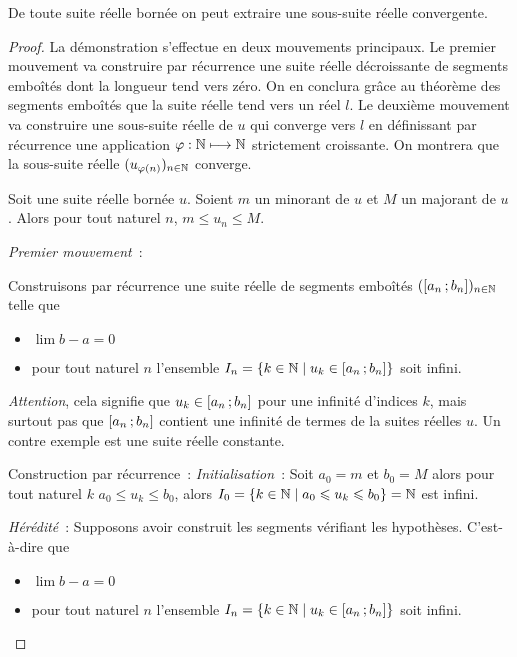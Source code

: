 \begin{theo}
  De toute suite réelle bornée on peut extraire une sous-suite réelle convergente.
\end{theo}
\begin{proof}
 La démonstration s'effectue en deux mouvements principaux. Le premier mouvement va construire par récurrence une suite réelle décroissante de segments emboîtés dont la longueur tend vers zéro. On en conclura grâce au théorème des segments emboîtés que la suite réelle tend vers un réel \(l\). Le deuxième mouvement va construire une sous-suite réelle de \(u\) qui converge vers \(l\) en définissant par récurrence une application \(\varphi : \mathbb{N} \longmapsto \mathbb{N}\) strictement croissante. On montrera que la sous-suite réelle \((u_{\varphi(n)})_{n \in \mathbb{N}}\) converge.

 Soit une suite réelle bornée \(u\). Soient \(m\) un minorant de \(u\) et \(M\) un majorant de \(u\). Alors pour tout naturel \(n\), \(m \leqslant u_n \leqslant M\).

\emph{Premier mouvement}~:

Construisons par récurrence une suite réelle de segments emboîtés \((\left[ a_n \, ;  b_n \right])_{n \in \mathbb{N}}\) telle que
\begin{itemize}
\item \(\lim b-a =0\)
\item pour tout naturel \(n\) l'ensemble \(I_n = \left\{k \in \mathbb{N}\mathrel{}\middle|\mathrel{}u_k \in \left[ a_n \, ;  b_n \right]\right\}\) soit infini.
\end{itemize}

\emph{Attention}, cela signifie que \(u_k \in \left[ a_n \, ;  b_n \right]\) pour une infinité d'indices \(k\), mais surtout pas que \(\left[ a_n \, ;  b_n \right]\) contient une infinité de termes de la suites réelles \(u\). Un contre exemple est une suite réelle constante.

Construction par récurrence~:
\emph{Initialisation}~: Soit \(a_0=m\) et \(b_0=M\) alors pour tout naturel \(k\) \(a_0 \leqslant u_k \leqslant b_0\), alors \(I_0 = \left\{k \in \mathbb{N}\mathrel{}\middle|\mathrel{}a_0 \leqslant u_k \leqslant b_0\right\}=\mathbb{N}\) est infini.

\emph{Hérédité}~: Supposons avoir construit les segments vérifiant les hypothèses. C'est-à-dire que
\begin{itemize}
\item \(\lim b-a =0\)
\item pour tout naturel \(n\) l'ensemble \(I_n = \left\{k \in \mathbb{N}\mathrel{}\middle|\mathrel{}u_k \in \left[ a_n \, ;  b_n \right]\right\}\) soit infini.
\end{itemize}


\end{proof}
